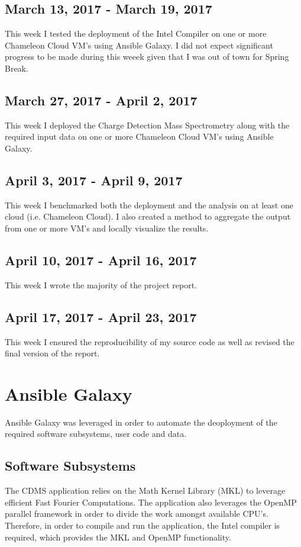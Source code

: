 \documentclass[9pt,twocolumn,twoside]{styles/osajnl}
\begin{document}
\subsection{March 13, 2017 - March 19, 2017}
This week I tested the deployment of the Intel Compiler on one or more
Chameleon Cloud VM's using Ansible Galaxy. I did not expect
significant progress to be made during this weeek given that I was out
of town for Spring Break.
\subsection{March 27, 2017 - April 2, 2017}
This week I deployed the Charge Detection Mass Spectrometry along with
the required input data on one or more Chameleon Cloud VM's using
Ansible Galaxy.
\subsection{April 3, 2017 - April 9, 2017}
This week I benchmarked both the deployment and the analysis on at
least one cloud (i.e. Chameleon Cloud). I also created a method to
aggregate the output from one or more VM's and locally visualize the
results.
\subsection{April 10, 2017 - April 16, 2017}
This week I wrote the majority of the project report. 
\subsection{April 17, 2017 - April 23, 2017}
This week I ensured the reproducibility of my source code as well as
revised the final version of the report.

\section{Ansible Galaxy} \label{licensing}
Ansible Galaxy was leveraged in order to automate the deoployment of
the required software subsystems, user code and data.

\subsection{Software Subsystems} \label{software}
The CDMS application relies on the Math Kernel Library (MKL) to
leverage efficient Fast Fourier Computations. The application also
leverages the OpenMP parallel framework in order to divide the work
amongst available CPU's. Therefore, in order to compile and run the
application, the Intel compiler is required, which provides the MKL
and OpenMP functionality.
\end{document}
